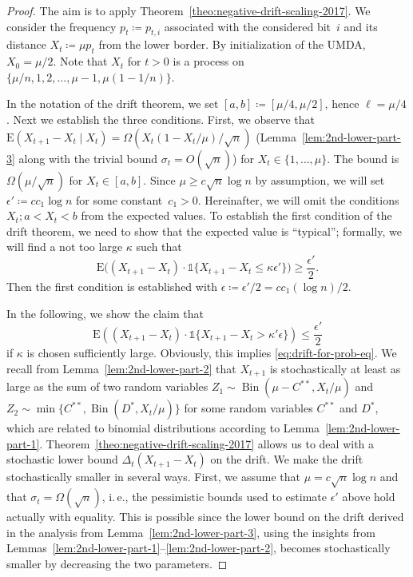 \documentclass[11pt, a4paper]{article}
\newcommand*{\E}{\mathrm{E}}
\newcommand{\ie}{i.\,e.\xspace}
\newcommand{\indic}[1]{\mathds{1}\{#1\}}
\DeclareMathOperator{\Bin}{Bin}
\begin{document}
\begin{proof}
The aim is to apply Theorem~\ref{theo:negative-drift-scaling-2017}. 
We consider the frequency $p_t\coloneqq p_{t,i}$ associated with the considered bit~$i$  
and its distance $X_t\coloneqq\mu p_{t}$ from the lower border. By initialization 
of the UMDA, $X_0=\mu/2$. Note 
that $X_t$ for $t>0$ is a process on $\{\mu/n,1,2,\dots,\mu-1,\mu(1-1/n)\}$. 

In the notation of the drift theorem, we set $[a,b]\coloneqq [\mu/4,\mu/2]$, hence 
$\ell=\mu/4$. Next we establish the three conditions. First, 
we observe that 
$\E(X_{t+1}-X_{t}\mid X_t)=\Omega(X_t(1-X_{t}/\mu)/\sqrt{n})$ (Lemma~\ref{lem:2nd-lower-part-3} 
along with the trivial bound $\sigma_t=O(\sqrt{n})$) 
for $X_t\in\{1,\dots,\mu\}$. The bound is $\Omega(\mu/\sqrt{n})$ for $X_t\in[a,b]$. Since 
$\mu\ge c\sqrt{n}\log n$ by assumption, we will 
set $\epsilon'\coloneqq  c c_1 \log n$ 
for some constant~$c_1>0$. Hereinafter, we will omit the conditions $X_t;a<X_t<b$ from the expected values. 
To establish the first condition of the 
drift theorem, 
we need to show that the expected value is ``typical''; formally,
we will find a not too large $\kappa$ such that 
\begin{equation}
\E\bigl((X_{t+1}-X_{t})\cdot\indic{X_{t+1}-X_t\le \kappa \epsilon'}\bigr)\ge \frac{\epsilon'}{2}.
\label{eq:drift-for-prob-eq}
\end{equation}
Then 
the first condition is established with $\epsilon\coloneqq \epsilon'/2 = c c_1 (\log n)/2$.

In the following, we show the claim that 
\[
\E((X_{t+1}-X_{t})\cdot\indic{X_{t+1}-X_t> \kappa'\epsilon}) \le \frac{\epsilon'}{2}\] if 
$\kappa$ is chosen sufficiently large. Obviously, this implies 
\eqref{eq:drift-for-prob-eq}. 
We recall 
from Lemma~\ref{lem:2nd-lower-part-2} 
that $X_{t+1}$ is stochastically at least as large as the sum of two random variables 
$Z_1\sim \Bin(\mu-C^{**},X_t/\mu)$ and $Z_2\sim \min\{C^{**},\Bin(D^*,X_t/\mu)\}$ 
for some random variables $C^{**}$ and $D^*$, which are related to binomial distributions according 
to Lemma~\ref{lem:2nd-lower-part-1}.  
 Theorem~\ref{theo:negative-drift-scaling-2017} allows us
to deal with a stochastic lower bound $\Delta_t(X_{t+1}-X_t)$ on the drift. We make the drift stochastically smaller 
in several ways. First, we assume that $\mu = c\sqrt{n}\log n$ and that $\sigma_t=\Omega(\sqrt{n})$, \ie, 
the pessimistic bounds used to estimate $\epsilon'$ above hold actually with equality. This is possible 
since the lower bound on the drift derived in the analysis from Lemma~\ref{lem:2nd-lower-part-3}, using the 
insights from Lemmas~\ref{lem:2nd-lower-part-1}--\ref{lem:2nd-lower-part-2}, becomes stochastically 
smaller by decreasing the two parameters. 


\end{proof}
\end{document}
